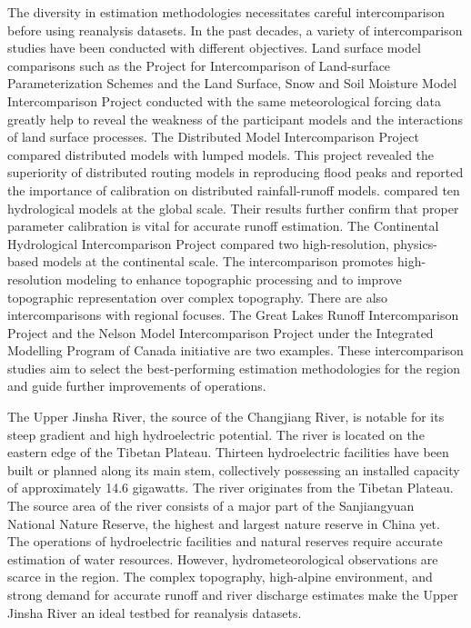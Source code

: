 \documentclass[water,article,submit,pdftex,moreauthors]{Definitions/mdpi}
\begin{document}
The diversity in estimation methodologies necessitates careful intercomparison before using reanalysis datasets. In the past decades, a variety of intercomparison studies have been conducted with different objectives. Land surface model comparisons such as the Project for Intercomparison of Land-surface Parameterization Schemes \citep{henderson-sellers1993BAMS} and the Land Surface, Snow and Soil Moisture Model Intercomparison Project \citep{van_den_hurk2016GMD} conducted with the same meteorological forcing data greatly help to reveal the weakness of the participant models and the interactions of land surface processes. The Distributed Model Intercomparison Project \citep{reed2004JH, smith2004JH} compared distributed models with lumped models. This project revealed the superiority of distributed routing models in reproducing flood peaks and reported the importance of calibration on distributed rainfall-runoff models. \citet{beck2017HESS} compared ten hydrological models at the global scale. Their results further confirm that proper parameter calibration is vital for accurate runoff estimation. The Continental Hydrological Intercomparison Project \citep{tijerina2021WRR} compared two high-resolution, physics-based models at the continental scale. The intercomparison promotes high-resolution modeling to enhance topographic processing and to improve topographic representation over complex topography. There are also intercomparisons with regional focuses. The Great Lakes Runoff Intercomparison Project \citep{mai2022HESS} and the Nelson Model Intercomparison Project under the Integrated Modelling Program of Canada initiative \citep{ahmed2023JH} are two examples. These intercomparison studies aim to select the best-performing estimation methodologies for the region and guide further improvements of operations.

The Upper Jinsha River, the source of the Changjiang River, is notable for its steep gradient and high hydroelectric potential. The river is located on the eastern edge of the Tibetan Plateau. Thirteen hydroelectric facilities have been built or planned along its main stem, collectively possessing an installed capacity of approximately 14.6 gigawatts. The river originates from the Tibetan Plateau. The source area of the river consists of a major part of the Sanjiangyuan National Nature Reserve, the highest and largest nature reserve in China yet. The operations of hydroelectric facilities and natural reserves require accurate estimation of water resources. However, hydrometeorological observations are scarce in the region. The complex topography, high-alpine environment, and strong demand for accurate runoff and river discharge estimates make the Upper Jinsha River an ideal testbed for reanalysis datasets.
\end{document}
